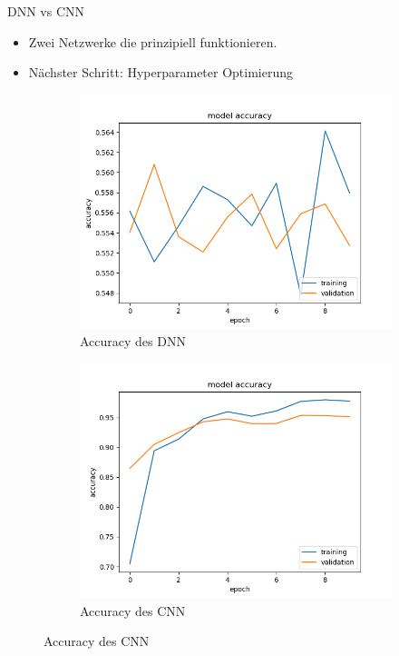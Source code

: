 \documentclass[aspectratio=1610, 9pt]{beamer}
\begin{document}
\begin{frame}{DNN vs CNN}
  \begin{itemize}
  \item Zwei Netzwerke die prinzipiell funktionieren.
  \item Nächster Schritt: Hyperparameter Optimierung
  \end{itemize}

  \begin{figure}
    \centering
    \begin{subfigure}{0.4\textwidth}
      \includegraphics[scale=0.35]{images/dnn_acc.png}
      \caption{Accuracy des DNN}
      \label{fig:dnn}
    \end{subfigure}
    \begin{subfigure}{0.4\textwidth}
      \includegraphics[scale=0.35]{images/cnn_acc.png}
      \caption{Accuracy des CNN}
      \label{fig:cnn}
    \end{subfigure}
  \end{figure}

\end{frame}
\end{document}
